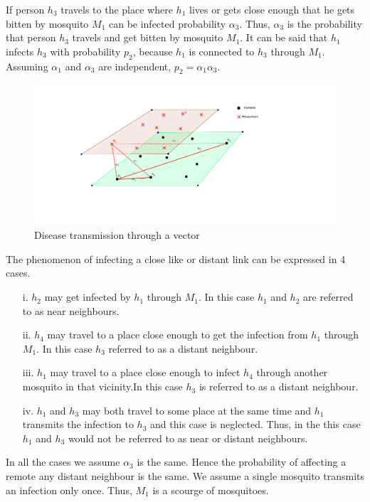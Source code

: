  If person $h_3$ travels to the place where $h_1$ lives or gets close enough that he gets bitten by mosquito $M_1$ can be infected probability $\alpha_3$. Thus, $\alpha_3$ is the probability that person $h_3$ travels and get bitten by mosquito $M_1$. It can be said that $h_1$ infects $h_3$ with probability $p_2$, because $h_1$ is connected to $h_3$ through $M_1$. Assuming $\alpha_1$ and $\alpha_3$ are independent, $p_2 = \alpha_1 \alpha_3$.
\begin{figure}[h!]
\centering
\includegraphics[scale=1]{images/human_mosquito.png}
\caption{Disease transmission through a vector} \label{fig5}
\end{figure}
The phenomenon of infecting a close like  or distant link can be expressed in 4 cases.


\begin{itemize}
\item[i.] $h_2$ may get infected by $h_1$ through $M_1$. In this case $h_1$ and $h_2$ are referred to as near neighbours.
\item[ii.] $h_4$ may travel to a place close enough to get the infection from $h_1$ through $M_1$. In this case $h_3$  referred to as a distant neighbour.
\item[iii.] $ h_1$ may travel to a place close enough to infect $h_4$  through another mosquito in that vicinity.In this case $h_3$ is  referred to as a distant neighbour.
\item[iv.] $h_1$  and $h_3$ may both travel to some place at the same time and $h_1$ transmits the infection to $h_3$ and this case is neglected. Thus, in the this case $h_1$ and $h_3$ would not be referred to as near or distant neighbours.
\end{itemize}

In all the cases we assume $\alpha_3$ is the same. Hence the probability of affecting a remote any distant neighbour is the same. We assume a single mosquito transmits an infection only once. Thus, $M_1$ is a scourge of mosquitoes.

